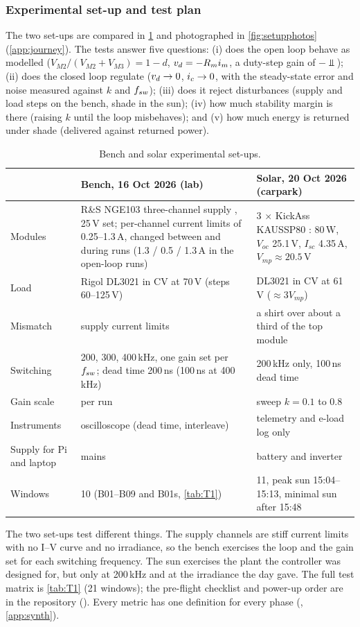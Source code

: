 \subsubsection{Experimental set-up and test plan}
\label{sec:setup}
The two set-ups are compared in \cref{tab:setup} and photographed in \cref{fig:setupphotos} (\cref{app:journey}). The tests answer five questions: (i) does the open loop behave as modelled ($V_{M2}/(V_{M2}+V_{M3}) = 1-d$, $v_{d} = -R_mi_{m}$, a duty-step gain of $-\Vbar$); (ii) does the closed loop regulate ($v_{d} \rightarrow 0$, $i_{c} \rightarrow 0$, with the steady-state error and noise measured against $k$ and $f_{sw}$); (iii) does it reject disturbances (supply and load steps on the bench, shade in the sun); (iv) how much stability margin is there (raising $k$ until the loop misbehaves); and (v) how much energy is returned under shade (delivered against returned power).

\begin{table}[htbp]\centering\small
\caption{Bench and solar experimental set-ups.}
\label{tab:setup}
\begin{tabularx}{\linewidth}{l X X}
\toprule
 & Bench, 16 Oct 2026 (lab) & Solar, 20 Oct 2026 (carpark)\\
\midrule
Modules & R\&S NGE103 three-channel supply \cite{rohde_nge100_ds}, 25\,V set; per-channel current limits of 0.25--1.3\,A, changed between and during runs (1.3 / 0.5 / 1.3\,A in the open-loop runs) & 3 $\times$ KickAss KAUSSP80 \cite{kaussp80_ds}: 80\,W, $V_{oc}$ 25.1\,V, $I_{sc}$ 4.35\,A, $V_{mp} \approx 20.5$\,V\\
Load & Rigol DL3021 \cite{rigol_dl3000_ds} in CV at 70\,V (steps 60--125\,V) & DL3021 in CV at 61\,V ($\approx 3V_{mp}$)\\
Mismatch & supply current limits & a shirt over about a third of the top module\\
Switching & 200, 300, 400\,kHz, one gain set per $f_{sw}$; dead time 200\,ns (100\,ns at 400\,kHz) & 200\,kHz only, 100\,ns dead time\\
Gain scale & per run & sweep $k = 0.1$ to 0.8\\
Instruments & oscilloscope (dead time, interleave) & telemetry and e-load log only\\
Supply for Pi and laptop & mains & battery and inverter\\
Windows & 10 (B01--B09 and B01s, \cref{tab:T1}) & 11, peak sun 15:04--15:13, minimal sun after 15:48\\
\bottomrule
\end{tabularx}
\end{table}
The two set-ups test different things. The supply channels are stiff current limits with no I--V curve and no irradiance, so the bench exercises the loop and the gain set for each switching frequency. The sun exercises the plant the controller was designed for, but only at 200\,kHz and at the irradiance the day gave. The full test matrix is \cref{tab:T1} (21 windows); the pre-flight checklist and power-up order are in the repository (). Every metric has one definition for every phase (, \cref{app:synth}).

